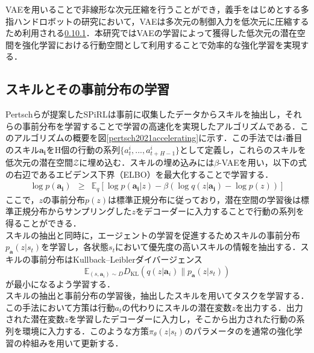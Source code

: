 \documentclass[dvipdfmx]{ampbt_nomag}
\begin{document}
VAEを用いることで非線形な次元圧縮を行うことができ，義手をはじめとする多指ハンドロボットの研究において，VAEは多次元の制御入力を低次元に圧縮するため利用される\ref{}\ref{}．本研究ではVAEの学習によって獲得した低次元の潜在空間を強化学習における行動空間として利用することで効率的な強化学習を実現する．




\subsection{スキルとその事前分布の学習}
Pertschらが提案したSPiRLは事前に収集したデータからスキルを抽出し，それらの事前分布を学習することで学習の高速化を実現したアルゴリズムである\cite{pertsch2021accelerating}．このアルゴリズムの概要を図\ref{pertsch2021accelerating}に示す．この手法では$i$番目のスキル$\boldsymbol{a_i}$をH個の行動の系列$\{a^i_t,...,a^i_{t+H-1}\}$として定義し，これらのスキルを低次元の潜在空間$\mathcal{Z}$に埋め込む．スキルの埋め込みには$\beta$-VAEを用い，以下の式の右辺であるエビデンス下界（ELBO）を最大化することで学習する．
\begin{eqnarray} 
\label{ELBO}
\log p(\boldsymbol{a_i}) &\geq& \mathbb{E}_q [\log p(\boldsymbol{a_i}|z)  -\beta(\log{q(z|\boldsymbol{a_i})} - \log{p(z)})]
\end{eqnarray}
ここで，$z$の事前分布$p(z)$は標準正規分布に従っており，潜在空間の学習後は標準正規分布からサンプリングした$z$をデコーダーに入力することで行動の系列を得ることができる．\\
スキルの抽出と同時に，エージェントの学習を促進するためスキルの事前分布$p_{\boldsymbol{a}}(z|s_t)$を学習し，各状態$s_t$において優先度の高いスキルの情報を抽出する．スキルの事前分布はKullback--Leiblerダイバージェンス
\begin{equation}
  \mathbb{E}_{(s,\boldsymbol{a}_i)\sim D}D_\mathrm{KL}\left(q(z|\boldsymbol{a}_i)\|p_{\boldsymbol{a}}(z|s_t)\right)
\end{equation}
が最小になるよう学習する．\\
スキルの抽出と事前分布の学習後，抽出したスキルを用いてタスクを学習する．この手法において方策は行動$a_t$の代わりにスキルの潜在変数$z$を出力する．出力された潜在変数$z$を学習したデコーダーに入力し，そこから出力された行動の系列を環境に入力する．このような方策$\pi_\theta(z|s_t)$のパラメータのを通常の強化学習の枠組みを用いて更新する．
\end{document}
